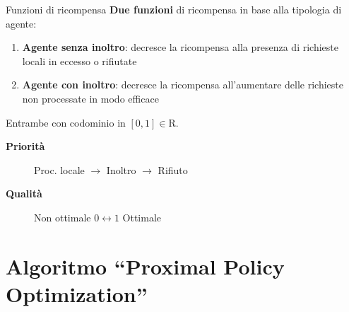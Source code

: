 \documentclass[]{beamer}
\begin{document}
\begin{frame}{Funzioni di ricompensa}
    \textbf{Due funzioni} di ricompensa in base alla tipologia di agente:

    \begin{enumerate}
        \item \textbf{Agente senza inoltro}: decresce la ricompensa alla presenza di richieste locali in eccesso o rifiutate

        \item \textbf{Agente con inoltro}: decresce la ricompensa all'aumentare delle richieste non processate in modo efficace
    \end{enumerate}

    \vspace{.5cm}

    Entrambe con codominio in $[0, 1] \in \mathrm{R}$.

    \begin{description}
        \item[\textbf{Priorità}] Proc. locale $\rightarrow$ Inoltro $\rightarrow$ Rifiuto

        \item[\textbf{Qualità}] Non ottimale $0 \longleftrightarrow 1$ Ottimale
    \end{description}
\end{frame}

\section{Algoritmo ``Proximal Policy Optimization''}
\end{document}
